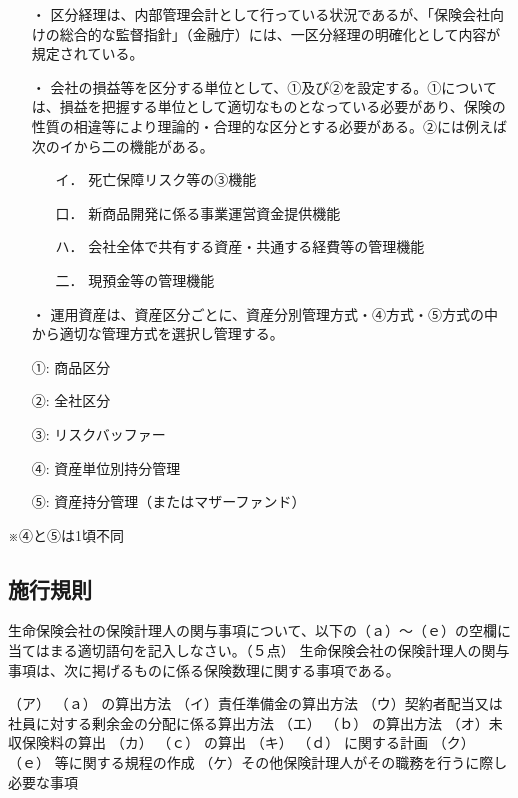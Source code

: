 \documentclass[report,gutter=10mm,fore-edge=10mm,uplatex,dvipdfmx]{jlreq}
\begin{document}
\begin{itemize}
\item[・] 区分経理は、内部管理会計として行っている状況であるが、「保険会社向けの総合的な監督指針」（金融庁）には、一区分経理の明確化として内容が規定されている。
\item[・] 会社の損益等を区分する単位として、①及び②を設定する。①については、損益を把握する単位として適切なものとなっている必要があり、保険の性質の相違等により理論的・合理的な区分とする必要がある。②には例えば次のイから二の機能がある。
\begin{itemize}
\item[イ．] 死亡保障リスク等の③機能
\item[口．] 新商品開発に係る事業運営資金提供機能
\item[ハ．] 会社全体で共有する資産・共通する経費等の管理機能
\item[二．] 現預金等の管理機能
\end{itemize}
\item[・]運用資産は、資産区分ごとに、資産分別管理方式・④方式・⑤方式の中から適切な管理方式を選択し管理する。
\end{itemize}

\answer{}
\begin{itemize}
\item[①:] 商品区分
\item[②:] 全社区分
\item[③:] リスクバッファー
\item[④:] 資産単位別持分管理
\item[⑤:] 資産持分管理（またはマザーファンド）
\end{itemize}
※④と⑤は1頃不同



\subsection{施行規則}


生命保険会社の保険計理人の関与事項について、以下の（ａ）～（ｅ）の空欄に当てはまる適切語句を記入しなさい。（５点）
生命保険会社の保険計理人の関与事項は、次に掲げるものに係る保険数理に関する事項である。

（ア） （ａ） の算出方法
（イ）責任準備金の算出方法
（ウ）契約者配当又は社員に対する剰余金の分配に係る算出方法
（エ） （ｂ） の算出方法
（オ）未収保険料の算出
（カ） （ｃ） の算出
（キ） （ｄ） に関する計画
（ク） （ｅ） 等に関する規程の作成
（ケ）その他保険計理人がその職務を行うに際し必要な事項
\end{document}
